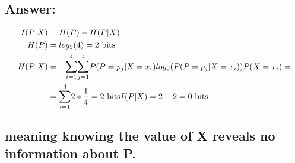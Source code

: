 \documentclass[11px]{article}
\begin{document}
\subsection*{Answer:}

\begin{equation}
\begin{split}
I(P|X) & = H(P) - H(P|X) \\
H(P) & = log_2(4) = 2 \text{ bits}\\
H(P|X) & = -\mathlarger{\sum}_{i=1}^{4} \mathlarger{\sum}_{j=1}^{4} P(P = p_j|X = x_i)log_2(P(P = p_j|X = x_i))P(X = x_i) = \\
& = \mathlarger{\sum}_{i=1}^{4} 2*\frac{1}{4} = 2 \text{ bits}
I(P|X) = 2 - 2 = 0 \text{ bits}
\end{split}    
\end{equation}

\subsection*{meaning knowing the value of X reveals no information about P.}
\end{document}
